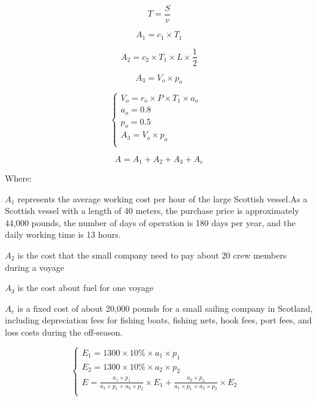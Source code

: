 \documentclass{mcmthesis}
\begin{document}
\begin{equation}\label{5}
T=\frac{S}{v}
\end{equation}


\begin{equation}\label{5}
A_1=c_1 \times T_1
\end{equation}

\begin{equation}\label{6}
A_2=c_2  \times T_1 \times L \times  \frac{1}{2}
\end{equation}

\begin{equation}\label{7}
A_3=V_o  \times p_o
\end{equation}

\begin{equation}
\left\{
\begin{array}{lr}
V_o=r_o \times P \times T_1 \times a_o &\\
a_o=0.8&\\
p_o=0.5&\\
A_3=V_o  \times p_o\\
\end{array}
\right.
\end{equation}





\begin{equation}\label{8}
A=A_1+A_2+A_3+A_e
\end{equation}

Where:

$A_1$ represents the average working cost per hour of the large Scottish vessel.As a Scottish vessel with a length of 40 meters, the purchase price is approximately 44,000 pounds, the number of days of operation is 180 days per year, and the daily working time is 13 hours.

$A_2$ is the cost that the small company need to pay about 20 crew members during a voyage

$A_3$ is the cost about fuel for one voyage

$A_e$ is a fixed cost of about 20,000 pounds for a small sailing company in Scotland, including depreciation fees for fishing boats, fishing nets, hook fees, port fees, and loss costs during the off-season.
 


\begin{equation}
\left\{
\begin{array}{lr}

E_1=1300 \times 10\% \times a_1 \times p_1 &\\
E_2=1300 \times 10\% \times a_2 \times p_2 &\\
E= \frac{a_1 \times p_1}{a_1 \times p_1+ a_2 \times p_2} \times E_1 + \frac{a_2 \times p_2}{a_1 \times p_1+ a_2 \times p_2} \times E_2\\

\end{array}
\right.
\end{equation}
\end{document}
